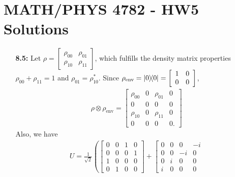 \documentclass[a4paper,12pt]{article}
\begin{document}
	
\section*{MATH/PHYS 4782 - HW5 Solutions}

\begin{enumerate}
    \item[\textbf{8.5:}]
        Let $\rho = \left[
            \begin{array}{cc}
                \rho_{00} & \rho_{01} \\
                \rho_{10} & \rho_{11}
            \end{array}
        \right]$, which fulfills the density matrix properties $\rho_{00} + \rho_{11} = 1$ and $\rho_{01} = \rho_{10}^*$.
        Since $\rho_{\text{env}} = \dyad{0}{0} = \left[
            \begin{array}{cc}
                1 & 0 \\
                0 & 0
            \end{array}
        \right]$,
        \begin{align*}
            \rho \otimes \rho_{\text{env}} = \left[
                \begin{array}{cccc}
                    \rho_{00} & 0 & \rho_{01} & 0 \\
                    0 & 0 & 0 & 0 \\
                    \rho_{10} & 0 & \rho_{11} & 0 \\
                    0 & 0 & 0 & 0.
                \end{array}
            \right]
        \end{align*}
        Also, we have
        \begin{align*}
            U = \frac{1}{\sqrt{2}} \left( \left[
                \begin{array}{cccc}
                    0 & 0 & 1 & 0 \\
                    0 & 0 & 0 & 1 \\
                    1 & 0 & 0 & 0 \\
                    0 & 1 & 0 & 0
                \end{array}
            \right]
            + \left[
                \begin{array}{cccc}
                    0 & 0 & 0 & -i \\
                    0 & 0 & -i & 0 \\
                    0 & i & 0 & 0 \\
                    i & 0 & 0 & 0

\end{array}
\end{align*}
\end{enumerate}
\end{document}

